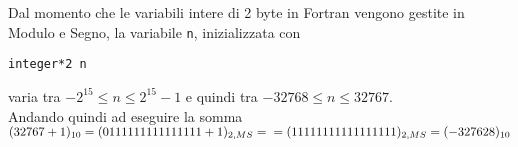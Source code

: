 Dal momento che le variabili intere di 2 byte in Fortran vengono gestite in Modulo e Segno, la variabile \texttt{n}, inizializzata con

\begin{lstlisting}
integer*2 n
\end{lstlisting}
varia tra \( - 2^{15} \leq n \leq 2^{15} - 1 \) e quindi tra  \( -32768 \leq n \leq 32767 \). \\
Andando quindi ad eseguire la somma \( (32767+1)_{10} = (0111111111111111 + 1)_{2,MS} = \\
= (11111111111111111)_{2,MS} = (-327628)_{10} \)
